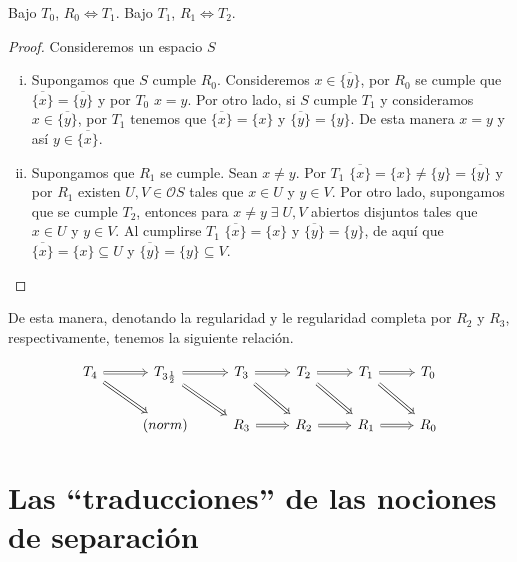 \begin{prop}\label{R0 y R1}
    Bajo $T_0$, $R_0 \Leftrightarrow T_1$. Bajo $T_1$, $R_1 \Leftrightarrow T_2$.
\end{prop}

\begin{proof}
Consideremos un espacio $S$
    \begin{enumerate}[i)]
        \item Supongamos que $S$ cumple $R_0$. Consideremos $x\in \overline{\{y\}}$, por $R_0$ se cumple que $\overline{\{x\}}=\overline{\{y\}}$ y por $T_0$ $x=y$. Por otro lado, si $S$ cumple $T_1$ y consideramos $x\in \overline{\{y\}}$, por $T_1$ tenemos que $\overline{\{x\}}=\{x\}$ y $\overline{\{y\}}=\{y\}$. De esta manera $x=y$ y así $y\in \overline{\{x\}}$.
        \item Supongamos que $R_1$ se cumple. Sean $x\neq y$. Por $T_1$ $\overline{\{x\}}=\{x\}\neq \{y\}=\overline{\{y\}}$ y por $R_1$ existen $U, V\in\mathcal{O}S$ tales que $x\in U$ y $y\in V$. Por otro lado, supongamos que se cumple $T_2$, entonces para $x\neq y \;\exists\; U, V$ abiertos disjuntos tales que $x\in U$ y $y\in V$. Al cumplirse $T_1$  $\overline{\{x\}}=\{x\}$ y $\overline{\{y\}}=\{y\}$, de aquí que $\overline{\{x\}}=\{x\}\subseteq U$ y $\overline{\{y\}}=\{y\}\subseteq V$.
    \end{enumerate}
\end{proof}

De esta manera, denotando la regularidad y le regularidad completa por $R_2$ y $R_3$, respectivamente, tenemos la siguiente relación.

    \[\begin{tikzcd}
	{T_4} & {T_{3\frac{1}{2}}} & {T_3} & {T_2} & {T_1} & {T_0} \\
	& {(norm)} & {R_3} & {R_2} & {R_1} & {R_0}
	\arrow[Rightarrow, from=1-2, to=1-3]
	\arrow[Rightarrow, from=1-3, to=1-4]
	\arrow[Rightarrow, from=1-4, to=1-5]
	\arrow[Rightarrow, from=1-5, to=1-6]
	\arrow[Rightarrow, from=1-1, to=1-2]
	\arrow[Rightarrow, from=1-1, to=2-2]
	\arrow[Rightarrow, from=1-2, to=2-3]
	\arrow[Rightarrow, from=1-3, to=2-4]
	\arrow[Rightarrow, from=1-4, to=2-5]
	\arrow[Rightarrow, from=1-5, to=2-6]
	\arrow[Rightarrow, from=2-3, to=2-4]
	\arrow[Rightarrow, from=2-4, to=2-5]
	\arrow[Rightarrow, from=2-5, to=2-6]
\end{tikzcd}\]

\section{Las ``traducciones'' de las nociones de separación}

